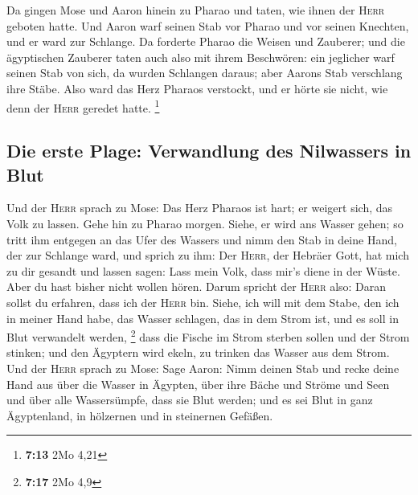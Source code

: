  Da gingen Mose und Aaron hinein zu Pharao und taten, wie
ihnen der \textsc{Herr} geboten hatte. Und Aaron warf seinen Stab vor
Pharao und vor seinen Knechten, und er ward zur Schlange.
 Da forderte Pharao die Weisen und Zauberer; und die
ägyptischen Zauberer taten auch also mit ihrem Beschwören:
 ein jeglicher warf seinen Stab von sich, da wurden
Schlangen daraus; aber Aarons Stab verschlang ihre Stäbe.
 Also ward das Herz Pharaos verstockt, und er hörte sie
nicht, wie denn der \textsc{Herr} geredet hatte. \footnote{\textbf{7:13}
  2Mo 4,21}

\hypertarget{die-erste-plage-verwandlung-des-nilwassers-in-blut}{%
\subsection{Die erste Plage: Verwandlung des Nilwassers in
Blut}\label{die-erste-plage-verwandlung-des-nilwassers-in-blut}}

 Und der \textsc{Herr} sprach zu Mose: Das Herz Pharaos
ist hart; er weigert sich, das Volk zu lassen.  Gehe hin
zu Pharao morgen. Siehe, er wird ans Wasser gehen; so tritt ihm entgegen
an das Ufer des Wassers und nimm den Stab in deine Hand, der zur
Schlange ward,  und sprich zu ihm: Der \textsc{Herr}, der
Hebräer Gott, hat mich zu dir gesandt und lassen sagen: Lass mein Volk,
dass mir's diene in der Wüste. Aber du hast bisher nicht wollen hören.
 Darum spricht der \textsc{Herr} also: Daran sollst du
erfahren, dass ich der \textsc{Herr} bin. Siehe, ich will mit dem Stabe,
den ich in meiner Hand habe, das Wasser schlagen, das in dem Strom ist,
und es soll in Blut verwandelt werden, \footnote{\textbf{7:17} 2Mo 4,9}
 dass die Fische im Strom sterben sollen und der Strom
stinken; und den Ägyptern wird ekeln, zu trinken das Wasser aus dem
Strom.  Und der \textsc{Herr} sprach zu Mose: Sage Aaron:
Nimm deinen Stab und recke deine Hand aus über die Wasser in Ägypten,
über ihre Bäche und Ströme und Seen und über alle Wassersümpfe, dass sie
Blut werden; und es sei Blut in ganz Ägyptenland, in hölzernen und in
steinernen Gefäßen.

